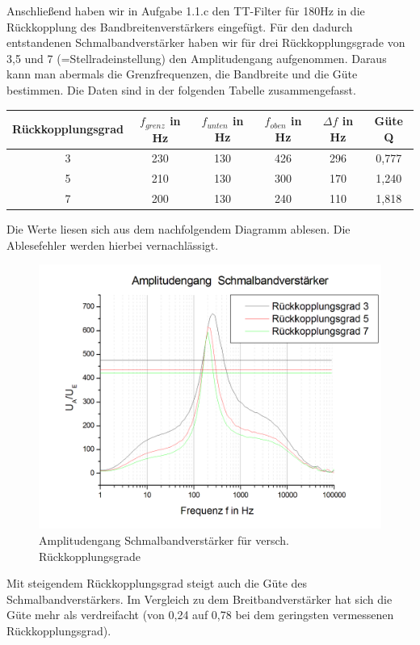 \documentclass{scrartcl}						%
\begin{document}
			Anschließend haben wir  in Aufgabe 1.1.c den TT-Filter für 180Hz in die Rückkopplung des Bandbreitenverstärkers eingefügt. Für den dadurch entstandenen Schmalbandverstärker haben wir für drei Rückkopplungsgrade von 3,5 und 7 (=Stellradeinstellung) den Amplitudengang aufgenommen. Daraus kann man abermals die Grenzfrequenzen, die Bandbreite und die Güte bestimmen. Die Daten sind in der folgenden Tabelle zusammengefasst.
			\center
			\begin{tabular}{|c|c|c|c|c|c|}
			\hline Rückkopplungsgrad & $f_{grenz}$ in Hz & $f_{unten}$ in Hz & $f_{oben}$ in Hz & $\Delta f$ in Hz & Güte Q \\ 
			\hline 3 & 230 & 130 & 426 & 296 & 0,777 \\ 
			\hline 5 & 210 & 130 & 300 & 170 & 1,240 \\ 
			\hline 7 & 200 & 130 & 240 & 110 & 1,818 \\ 
			\hline 
			\end{tabular}
			\flushleft Die Werte liesen sich aus dem nachfolgendem Diagramm ablesen. Die Ablesefehler werden hierbei vernachlässigt.
			\begin{figure}[h!]
					\centering
					\includegraphics[scale=0.4]{A1c}
					\caption{Amplitudengang Schmalbandverstärker für versch. Rückkopplungsgrade}
			\end{figure}
			
			Mit steigendem Rückkopplungsgrad steigt auch die Güte des Schmalbandverstärkers. Im Vergleich zu dem Breitbandverstärker hat sich die Güte mehr als verdreifacht (von 0,24 auf 0,78 bei dem geringsten vermessenen Rückkopplungsgrad).\\
			
\end{document}

